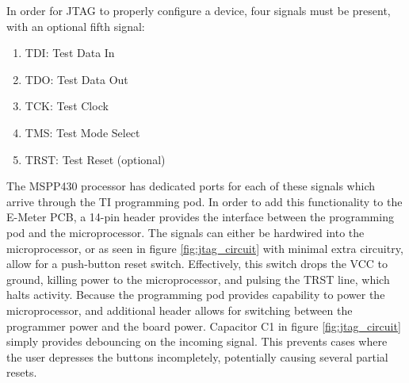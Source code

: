 In order for \ac{JTAG} to properly configure a device, four signals must be present, with an optional fifth signal:
\begin{enumerate}
\item TDI: Test Data In
\item TDO: Test Data Out
\item TCK: Test Clock
\item TMS: Test Mode Select
\item TRST: Test Reset (optional)
\end{enumerate}
The MSPP430 processor has dedicated ports for each of these signals which arrive through the \ac{TI} programming pod. In order to add this functionality to the E-Meter \ac{PCB}, a 14-pin header provides the interface between the programming pod and the microprocessor. The signals can either be hardwired into the microprocessor, or as seen in figure \ref{fig:jtag_circuit} with minimal extra circuitry, allow for a push-button reset switch. Effectively, this switch drops the VCC to ground, killing power to the microprocessor, and pulsing the \ac{TRST} line, which halts activity. Because the programming pod provides capability to power the microprocessor, and additional header allows for switching between the programmer power and the board power. Capacitor C1 in figure \ref{fig:jtag_circuit} simply provides debouncing on the incoming signal. This prevents cases where the user depresses the buttons incompletely, potentially causing several partial resets.






